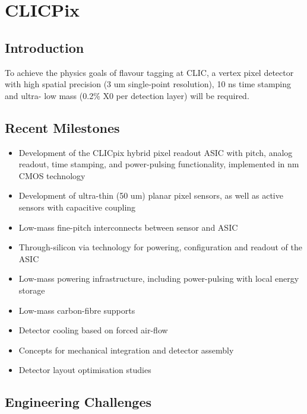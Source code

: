 \section{CLICPix}

\subsection{Introduction}
To achieve the physics goals of flavour tagging at CLIC, a vertex pixel detector with high spatial precision (3 um single-point resolution), 10 ns time stamping and ultra- low mass (0.2\% X0 per detection layer) will be required.

\subsection{Recent Milestones}
\begin{itemize}
\item Development of the CLICpix hybrid pixel readout ASIC with \unit[25]{\micron} pitch, analog readout, time stamping, and power-pulsing functionality, implemented in \unit[65]{nm} CMOS technology
\item Development of ultra-thin (50 um) planar pixel sensors, as well as active sensors with capacitive coupling
\item Low-mass fine-pitch interconnects between sensor and ASIC
\item Through-silicon via technology for powering, configuration and readout of the ASIC
\item Low-mass powering infrastructure, including power-pulsing with local energy storage
\item Low-mass carbon-fibre supports
\item Detector cooling based on forced air-flow
\item Concepts for mechanical integration and detector assembly
\item Detector layout optimisation studies
\end{itemize}

\subsection{Engineering Challenges}
